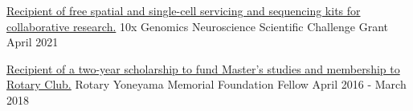 %
%
%


\vspace*{0.5cm}

\begin{cventries}
    \cventry
        {\textnormal{\href{https://www.10xgenomics.com/blog/advancing-neuroscience-with-multidimensional-investigations}{Recipient of free spatial and single-cell servicing and sequencing kits for collaborative research.}}}
        {10x Genomics Neuroscience Scientific Challenge Grant}
        {April 2021}
        {}
        {}

    \vspace*{-0.1cm}

    \cventry
        {\textnormal{\href{https://hiroorc.org/event/20180215-2/}{Recipient of a two-year scholarship to fund Master's studies and membership to Rotary Club.}}}
        {Rotary Yoneyama Memorial Foundation Fellow}
        {April 2016 - March 2018}
        {}
        {}

\end{cventries}

\vspace*{-0.65cm}
